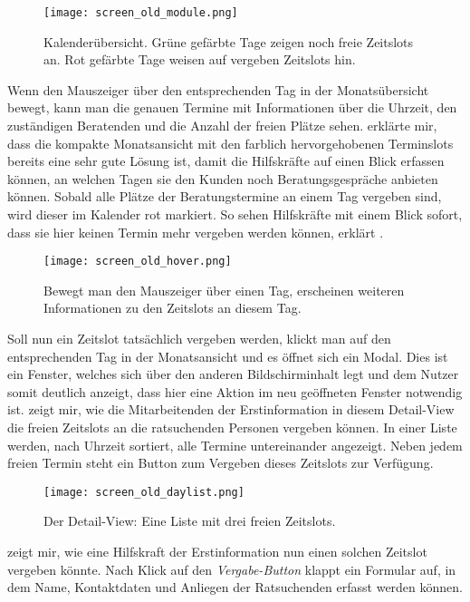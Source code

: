 \begin{figure}[H]
    \caption{Kalenderübersicht. Grüne gefärbte Tage zeigen noch freie Zeitslots an. Rot gefärbte Tage weisen auf vergeben Zeitslots hin.}
    \centering
    \texttt{[image: screen\_old\_module.png]}
\end{figure}

Wenn \ipName den Mauszeiger über den entsprechenden Tag in der Monatsübersicht
bewegt, kann man die genauen Termine mit Informationen über die Uhrzeit, den
zuständigen Beratenden und die Anzahl der freien Plätze sehen. \ipName erklärte
mir, dass die kompakte Monatsansicht mit den farblich hervorgehobenen
Terminslots bereits eine sehr gute Lösung ist, damit die Hilfskräfte auf einen
Blick erfassen können, an welchen Tagen sie den Kunden noch Beratungsgespräche
anbieten können. Sobald alle Plätze der Beratungstermine an einem Tag vergeben
sind, wird dieser im Kalender rot markiert. \glqq{}So sehen Hilfskräfte mit
einem Blick sofort, dass sie hier keinen Termin mehr vergeben werden
können\grqq{}, erklärt \ipName  \cite{claves}.

\begin{figure}[H]
    \caption{Bewegt man den Mauszeiger über einen Tag, erscheinen weiteren Informationen zu den Zeitslots an diesem Tag.}
    \centering
    \texttt{[image: screen\_old\_hover.png]}
\end{figure}

Soll nun ein Zeitslot tatsächlich vergeben werden, klickt man auf den
entsprechenden Tag in der Monatsansicht und es öffnet sich ein \gls{Modal}.
Dies ist ein Fenster, welches sich über den anderen Bildschirminhalt legt und
dem Nutzer somit deutlich anzeigt, dass hier eine Aktion im neu geöffneten
Fenster notwendig ist. \ipName zeigt mir, wie die Mitarbeitenden der
Erstinformation in diesem Detail-\gls{View} die freien Zeitslots an die
ratsuchenden Personen vergeben können. In einer Liste werden, nach Uhrzeit
sortiert, alle Termine untereinander angezeigt. Neben jedem freien Termin steht
ein Button zum Vergeben dieses Zeitslots zur Verfügung.

\begin{figure}[H]
    \caption{Der Detail-View: Eine Liste mit drei freien Zeitslots.}
    \centering
    \texttt{[image: screen\_old\_daylist.png]}
\end{figure}

\ipName zeigt mir, wie eine Hilfskraft der Erstinformation nun einen solchen
Zeitslot vergeben könnte. Nach Klick auf den \textit{Vergabe-Button} klappt ein
Formular auf, in dem Name, Kontaktdaten und Anliegen der Ratsuchenden erfasst
werden können.

